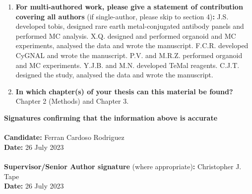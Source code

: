 \begin{enumerate}
        
        \item \textbf{For multi-authored work, please give a statement of contribution covering all authors} (if single-author, please skip to section 4)\textbf{:}
        J.S. developed \acrshort{tobis}, designed rare earth metal-conjugated antibody panels and performed MC analysis. X.Q. designed and performed organoid and MC experiments, analysed the data and wrote the manuscript. F.C.R. developed CyGNAL and wrote the manuscript. P.V. and M.R.Z. performed organoid and MC experiments. Y.J.B. and M.N. developed TeMal reagents. C.J.T. designed the study, analysed the data and wrote the manuscript.
        
        \item \textbf{In which chapter(s) of your thesis can this material be found?}
        Chapter 2 (Methods) and Chapter 3.
    \end{enumerate}
    
    \textbf{Signatures confirming that the information above is accurate}\\
    \textbf{}\\ 
    \textbf{Candidate:} Ferran Cardoso Rodriguez\\
    \textbf{Date:} 26 July 2023\\
    \textbf{}\\
    \textbf{Supervisor/Senior Author signature} (where appropriate)\textbf{:} Christopher J. Tape\\
    \textbf{Date:} 26 July 2023	

